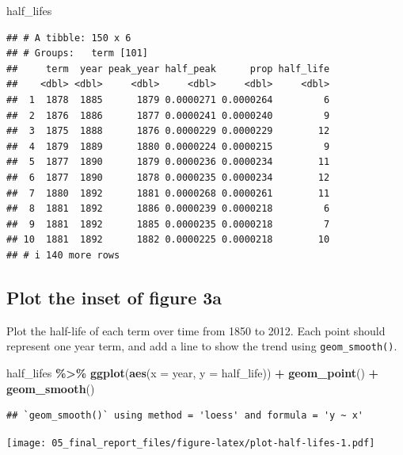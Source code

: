 \documentclass[
]{article}
\newenvironment{Shaded}{\begin{snugshade}}{\end{snugshade}}
\newcommand{\AttributeTok}[1]{\textcolor[rgb]{0.13,0.29,0.53}{#1}}
\newcommand{\FunctionTok}[1]{\textcolor[rgb]{0.13,0.29,0.53}{\textbf{#1}}}
\newcommand{\NormalTok}[1]{#1}
\newcommand{\SpecialCharTok}[1]{\textcolor[rgb]{0.81,0.36,0.00}{\textbf{#1}}}
\begin{document}
\begin{Shaded}
\begin{Highlighting}[]
\NormalTok{half\_lifes}
\end{Highlighting}
\end{Shaded}

\begin{verbatim}
## # A tibble: 150 x 6
## # Groups:   term [101]
##     term  year peak_year half_peak      prop half_life
##    <dbl> <dbl>     <dbl>     <dbl>     <dbl>     <dbl>
##  1  1878  1885      1879 0.0000271 0.0000264         6
##  2  1876  1886      1877 0.0000241 0.0000240         9
##  3  1875  1888      1876 0.0000229 0.0000229        12
##  4  1879  1889      1880 0.0000224 0.0000215         9
##  5  1877  1890      1879 0.0000236 0.0000234        11
##  6  1877  1890      1878 0.0000235 0.0000234        12
##  7  1880  1892      1881 0.0000268 0.0000261        11
##  8  1881  1892      1886 0.0000239 0.0000218         6
##  9  1881  1892      1885 0.0000235 0.0000218         7
## 10  1881  1892      1882 0.0000225 0.0000218        10
## # i 140 more rows
\end{verbatim}

\hypertarget{plot-the-inset-of-figure-3a}{%
\subsection{Plot the inset of figure
3a}\label{plot-the-inset-of-figure-3a}}

Plot the half-life of each term over time from 1850 to 2012. Each point
should represent one year term, and add a line to show the trend using
\texttt{geom\_smooth()}.

\begin{Shaded}
\begin{Highlighting}[]
\NormalTok{half\_lifes }\SpecialCharTok{\%\textgreater{}\%}
  \FunctionTok{ggplot}\NormalTok{(}\FunctionTok{aes}\NormalTok{(}\AttributeTok{x =}\NormalTok{ year, }\AttributeTok{y =}\NormalTok{ half\_life)) }\SpecialCharTok{+}
  \FunctionTok{geom\_point}\NormalTok{() }\SpecialCharTok{+}
  \FunctionTok{geom\_smooth}\NormalTok{()}
\end{Highlighting}
\end{Shaded}

\begin{verbatim}
## `geom_smooth()` using method = 'loess' and formula = 'y ~ x'
\end{verbatim}

\texttt{[image: 05\_final\_report\_files/figure-latex/plot-half-lifes-1.pdf]}
\end{document}

